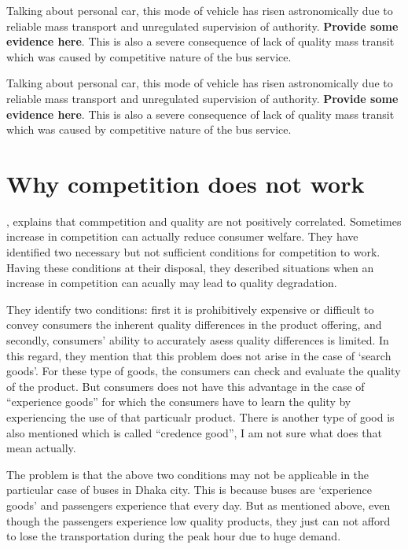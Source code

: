 \documentclass[
  11pt,
]{article}
\begin{document}
Talking about personal car, this mode of vehicle has risen
astronomically due to reliable mass transport and unregulated
supervision of authority. \textbf{Provide some evidence here}. This is
also a severe consequence of lack of quality mass transit which was
caused by competitive nature of the bus service.

Talking about personal car, this mode of vehicle has risen
astronomically due to reliable mass transport and unregulated
supervision of authority. \textbf{Provide some evidence here}. This is
also a severe consequence of lack of quality mass transit which was
caused by competitive nature of the bus service.

\hypertarget{why-competition-does-not-work}{%
\section{Why competition does not
work}\label{why-competition-does-not-work}}

\textcite{ezrachi_curious_2015}, explains that commpetition and quality
are not positively correlated. Sometimes increase in competition can
actually reduce consumer welfare. They have identified two necessary but
not sufficient conditions for competition to work. Having these
conditions at their disposal, they described situations when an increase
in competition can acually may lead to quality degradation.

They identify two conditions: first it is prohibitively expensive or
difficult to convey consumers the inherent quality differences in the
product offering, and secondly, consumers' ability to accurately asess
quality differences is limited. In this regard, they mention that this
problem does not arise in the case of `search goods'. For these type of
goods, the consumers can check and evaluate the quality of the product.
But consumers does not have this advantage in the case of ``experience
goods'' for which the consumers have to learn the qulity by experiencing
the use of that particualr product. There is another type of good is
also mentioned which is called ``credence good'', I am not sure what
does that mean actually.

The problem is that the above two conditions may not be applicable in
the particular case of buses in Dhaka city. This is because buses are
`experience goods' and passengers experience that every day. But as
mentioned above, even though the passengers experience low quality
products, they just can not afford to lose the transportation during the
peak hour due to huge demand.
\end{document}
